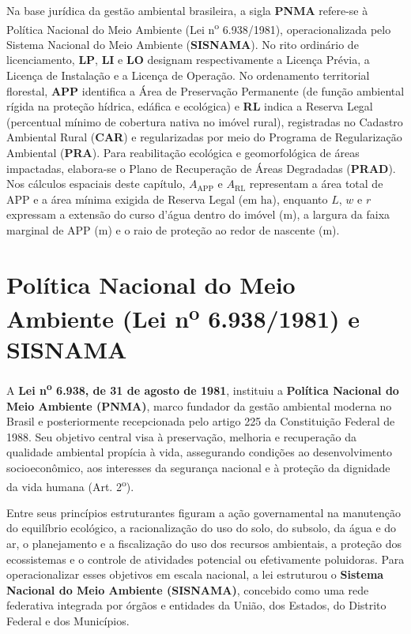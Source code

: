 
\begin{boxSimbolo}
Na base jurídica da gestão ambiental brasileira, a sigla \textbf{PNMA} refere-se à Política Nacional do Meio Ambiente (Lei n\textsuperscript{o} 6.938/1981), operacionalizada pelo Sistema Nacional do Meio Ambiente (\textbf{SISNAMA}). No rito ordinário de licenciamento, \textbf{LP}, \textbf{LI} e \textbf{LO} designam respectivamente a Licença Prévia, a Licença de Instalação e a Licença de Operação. No ordenamento territorial florestal, \textbf{APP} identifica a Área de Preservação Permanente (de função ambiental rígida na proteção hídrica, edáfica e ecológica) e \textbf{RL} indica a Reserva Legal (percentual mínimo de cobertura nativa no imóvel rural), registradas no Cadastro Ambiental Rural (\textbf{CAR}) e regularizadas por meio do Programa de Regularização Ambiental (\textbf{PRA}). Para reabilitação ecológica e geomorfológica de áreas impactadas, elabora-se o Plano de Recuperação de Áreas Degradadas (\textbf{PRAD}). Nos cálculos espaciais deste capítulo, $A_{\text{APP}}$ e $A_{\text{RL}}$ representam a área total de APP e a área mínima exigida de Reserva Legal (em $\text{ha}$), enquanto $L$, $w$ e $r$ expressam a extensão do curso d'água dentro do imóvel ($\text{m}$), a largura da faixa marginal de APP ($\text{m}$) e o raio de proteção ao redor de nascente ($\text{m}$).
\end{boxSimbolo}

\section{Política Nacional do Meio Ambiente (Lei n\textsuperscript{o} 6.938/1981) e SISNAMA}

A \textbf{Lei n\textsuperscript{o} 6.938, de 31 de agosto de 1981}, instituiu a \textbf{Política Nacional do Meio Ambiente (PNMA)}, marco fundador da gestão ambiental moderna no Brasil e posteriormente recepcionada pelo artigo 225 da Constituição Federal de 1988. Seu objetivo central visa à preservação, melhoria e recuperação da qualidade ambiental propícia à vida, assegurando condições ao desenvolvimento socioeconômico, aos interesses da segurança nacional e à proteção da dignidade da vida humana (Art. 2\textsuperscript{o}).

Entre seus princípios estruturantes figuram a ação governamental na manutenção do equilíbrio ecológico, a racionalização do uso do solo, do subsolo, da água e do ar, o planejamento e a fiscalização do uso dos recursos ambientais, a proteção dos ecossistemas e o controle de atividades potencial ou efetivamente poluidoras. Para operacionalizar esses objetivos em escala nacional, a lei estruturou o \textbf{Sistema Nacional do Meio Ambiente (SISNAMA)}, concebido como uma rede federativa integrada por órgãos e entidades da União, dos Estados, do Distrito Federal e dos Municípios.

